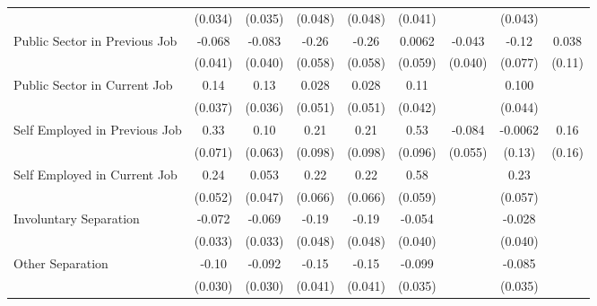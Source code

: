 {\begin{tabular}{l*{8}{c}}
               & (0.034)         & (0.035)         & (0.048)         & (0.048)         & (0.041)         &                 & (0.043)         &                 \\
Public Sector in Previous Job&  -0.068\sym{*}  &  -0.083\sym{**} &   -0.26\sym{***}&   -0.26\sym{***}&  0.0062         &  -0.043         &   -0.12         &   0.038         \\
               & (0.041)         & (0.040)         & (0.058)         & (0.058)         & (0.059)         & (0.040)         & (0.077)         &  (0.11)         \\
Public Sector in Current Job&    0.14\sym{***}&    0.13\sym{***}&   0.028         &   0.028         &    0.11\sym{**} &                 &   0.100\sym{**} &                 \\
               & (0.037)         & (0.036)         & (0.051)         & (0.051)         & (0.042)         &                 & (0.044)         &                 \\
Self Employed in Previous Job&    0.33\sym{***}&    0.10         &    0.21\sym{**} &    0.21\sym{**} &    0.53\sym{***}&  -0.084         & -0.0062         &    0.16         \\
               & (0.071)         & (0.063)         & (0.098)         & (0.098)         & (0.096)         & (0.055)         &  (0.13)         &  (0.16)         \\
Self Employed in Current Job&    0.24\sym{***}&   0.053         &    0.22\sym{***}&    0.22\sym{***}&    0.58\sym{***}&                 &    0.23\sym{***}&                 \\
               & (0.052)         & (0.047)         & (0.066)         & (0.066)         & (0.059)         &                 & (0.057)         &                 \\
Involuntary Separation&  -0.072\sym{**} &  -0.069\sym{**} &   -0.19\sym{***}&   -0.19\sym{***}&  -0.054         &                 &  -0.028         &                 \\
               & (0.033)         & (0.033)         & (0.048)         & (0.048)         & (0.040)         &                 & (0.040)         &                 \\
Other Separation&   -0.10\sym{***}&  -0.092\sym{***}&   -0.15\sym{***}&   -0.15\sym{***}&  -0.099\sym{***}&                 &  -0.085\sym{**} &                 \\
               & (0.030)         & (0.030)         & (0.041)         & (0.041)         & (0.035)         &                 & (0.035)         &                 \\

\end{tabular}}
